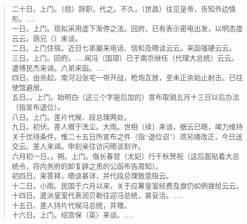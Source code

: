 \begin{quote}
	二十日。上门。（勋）辞职，代之。不久，（世昌）往见皇帝，告知外边情形。……\\

一日。上门。现拟采用虚下渐停之法。回府。已有表示密电出发，以明态度云云。荫兄（）来谈。\\

二日。上门住宿。近日七弟屡来电话、信和及晤谈云云。来函强硬云云。\\

三日。上门。回府。……闻冯（国璋）已于南京继任（代理大总统）云云。遣傅民杰来谒。六弟来函。……\\

四日。由余起，南河沿张宅一带开战，枪炮互放，至未正余始止射击。已往使馆避居。\\

五日。。上门。始明白（这三个字是后加的）宣布取销五月十三日以后办法（指宣布退位）。\\

八日。上门。差片代候、段总理两处。\\

九日。初伏。差人赠于洗尘。大雨。世相（续）来谈，据云已晤，竭力维持关于优待条件。惟二十五日所宣布之件（指“退位诏”）须另缮改正，今日送交云。差人来谒。申刻亲往访问晤谈刻许。\\

六月初一日。。朔。上门。偕长春宫（太妃）行千秋贺祝（这后面贴着大总统令，将内务府的卸复辟之责的公函布告周知）。\\

初四日。来答拜，晤谈甚详，并代段总理致意阻云。\\

十二日。小雨。民国于六月以来，关于应筹皇室经费及旗仍如例拨给云云。\\

十四日。遣派皇室代表润贝勒往迎冯总统，甚妥洽。……\\

十五日。差人持片代候冯总统，并赠。\\

十六日。上门。绍宫保（英）来谈。……\\


\end{quote}
